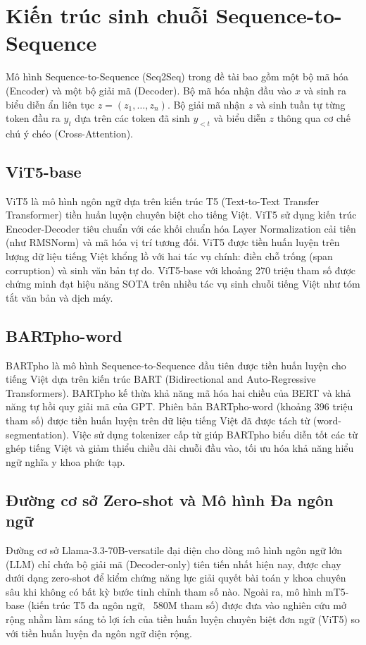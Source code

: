 \section{Kiến trúc sinh chuỗi Sequence-to-Sequence}
Mô hình Sequence-to-Sequence (Seq2Seq) trong đề tài bao gồm một bộ mã hóa (Encoder) và một bộ giải mã (Decoder). Bộ mã hóa nhận đầu vào $x$ và sinh ra biểu diễn ẩn liên tục $z = (z_1, \dots, z_n)$. Bộ giải mã nhận $z$ và sinh tuần tự từng token đầu ra $y_t$ dựa trên các token đã sinh $y_{<t}$ và biểu diễn $z$ thông qua cơ chế chú ý chéo (Cross-Attention).

\subsection{ViT5-base}
ViT5 \cite{phan2022vit5} là mô hình ngôn ngữ dựa trên kiến trúc T5 (Text-to-Text Transfer Transformer) tiền huấn luyện chuyên biệt cho tiếng Việt. ViT5 sử dụng kiến trúc Encoder-Decoder tiêu chuẩn với các khối chuẩn hóa Layer Normalization cải tiến (như RMSNorm) và mã hóa vị trí tương đối. ViT5 được tiền huấn luyện trên lượng dữ liệu tiếng Việt khổng lồ với hai tác vụ chính: điền chỗ trống (span corruption) và sinh văn bản tự do. ViT5-base với khoảng 270 triệu tham số được chứng minh đạt hiệu năng SOTA trên nhiều tác vụ sinh chuỗi tiếng Việt như tóm tắt văn bản và dịch máy.

\subsection{BARTpho-word}
BARTpho \cite{tran2021bartpho} là mô hình Sequence-to-Sequence đầu tiên được tiền huấn luyện cho tiếng Việt dựa trên kiến trúc BART (Bidirectional and Auto-Regressive Transformers). BARTpho kế thừa khả năng mã hóa hai chiều của BERT và khả năng tự hồi quy giải mã của GPT. Phiên bản BARTpho-word (khoảng 396 triệu tham số) được tiền huấn luyện trên dữ liệu tiếng Việt đã được tách từ (word-segmentation). Việc sử dụng tokenizer cấp từ giúp BARTpho biểu diễn tốt các từ ghép tiếng Việt và giảm thiểu chiều dài chuỗi đầu vào, tối ưu hóa khả năng hiểu ngữ nghĩa y khoa phức tạp.

\subsection{Đường cơ sở Zero-shot và Mô hình Đa ngôn ngữ}
Đường cơ sở Llama-3.3-70B-versatile đại diện cho dòng mô hình ngôn ngữ lớn (LLM) chỉ chứa bộ giải mã (Decoder-only) tiên tiến nhất hiện nay, được chạy dưới dạng zero-shot để kiểm chứng năng lực giải quyết bài toán y khoa chuyên sâu khi không có bất kỳ bước tinh chỉnh tham số nào. Ngoài ra, mô hình mT5-base \cite{xue2021mt5} (kiến trúc T5 đa ngôn ngữ, ~580M tham số) được đưa vào nghiên cứu mở rộng nhằm làm sáng tỏ lợi ích của tiền huấn luyện chuyên biệt đơn ngữ (ViT5) so với tiền huấn luyện đa ngôn ngữ diện rộng.
